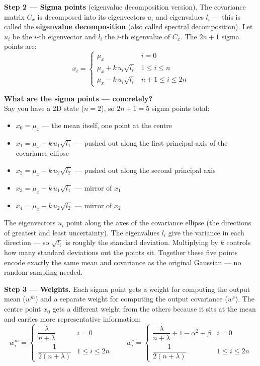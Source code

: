 \documentclass[12pt, a4paper]{article}
\begin{document}
\textbf{Step 2 --- Sigma points} (eigenvalue decomposition version).
The covariance matrix $C_x$ is decomposed into its eigenvectors $u_i$
and eigenvalues $l_i$ --- this is called the \textbf{eigenvalue
decomposition} (also called spectral decomposition).
Let $u_i$ be the $i$-th eigenvector and $l_i$ the $i$-th eigenvalue
of $C_x$.
The $2n+1$ sigma points are:
\[
  x_i = \begin{cases}
    \mu_x & i = 0 \\
    \mu_x + k\,u_i\sqrt{l_i} & 1 \leq i \leq n \\
    \mu_x - k\,u_i\sqrt{l_i} & n+1 \leq i \leq 2n
  \end{cases}
\]

\begin{notebox}
  \textbf{What are the sigma points --- concretely?}\\
  Say you have a 2D state ($n=2$), so $2n+1 = 5$ sigma points total:
  \begin{itemize}[leftmargin=1.4em, topsep=2pt]
    \item $x_0 = \mu_x$ \hfill --- the mean itself, one point at the centre
    \item $x_1 = \mu_x + k\,u_1\sqrt{l_1}$ \hfill --- pushed out along
          the first principal axis of the covariance ellipse
    \item $x_2 = \mu_x + k\,u_2\sqrt{l_2}$ \hfill --- pushed out along
          the second principal axis
    \item $x_3 = \mu_x - k\,u_1\sqrt{l_1}$ \hfill --- mirror of $x_1$
    \item $x_4 = \mu_x - k\,u_2\sqrt{l_2}$ \hfill --- mirror of $x_2$
  \end{itemize}
  The eigenvectors $u_i$ point along the axes of the covariance ellipse
  (the directions of greatest and least uncertainty).
  The eigenvalues $l_i$ give the variance in each direction --- so
  $\sqrt{l_i}$ is roughly the standard deviation.
  Multiplying by $k$ controls how many standard deviations out
  the points sit.
  Together these five points encode exactly the same mean and
  covariance as the original Gaussian --- no random sampling needed.
\end{notebox}

\textbf{Step 3 --- Weights.}
Each sigma point gets a weight for computing the output mean ($w^m$)
and a separate weight for computing the output covariance ($w^c$).
The centre point $x_0$ gets a different weight from the others because
it sits at the mean and carries more representative information:
\[
  w_i^m = \begin{cases}
    \dfrac{\lambda}{n+\lambda} & i = 0 \\[6pt]
    \dfrac{1}{2(n+\lambda)} & 1 \leq i \leq 2n
  \end{cases}
  \qquad
  w_i^c = \begin{cases}
    \dfrac{\lambda}{n+\lambda} + 1 - \alpha^2 + \beta & i = 0 \\[6pt]
    \dfrac{1}{2(n+\lambda)} & 1 \leq i \leq 2n
  \end{cases}
\]
\end{document}
